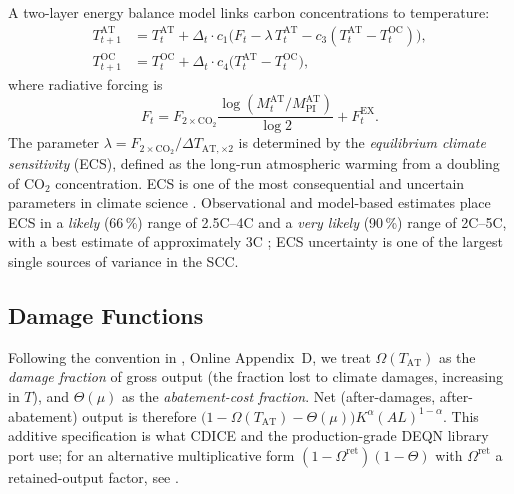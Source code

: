 \documentclass[11pt,a4paper]{report}
\begin{document}
A two-layer energy balance model links carbon concentrations to temperature:
\begin{align}
T^{\mathrm{AT}}_{t+1} &= T^{\mathrm{AT}}_t + \Delta_t \cdot c_1 \bigl(F_t - \lambda\, T^{\mathrm{AT}}_t - c_3(T^{\mathrm{AT}}_t - T^{\mathrm{OC}}_t)\bigr), \label{eq:temp_at} \\
T^{\mathrm{OC}}_{t+1} &= T^{\mathrm{OC}}_t + \Delta_t \cdot c_4 \bigl(T^{\mathrm{AT}}_t - T^{\mathrm{OC}}_t\bigr), \label{eq:temp_oc}
\end{align}
where radiative forcing is
\begin{equation}
F_t = F_{\mathrm{2\times CO_2}} \frac{\log(M^{\mathrm{AT}}_t / M^{\mathrm{AT}}_{\mathrm{PI}})}{\log 2} + F^{\mathrm{EX}}_t.
\label{eq:forcing}
\end{equation}
The parameter $\lambda = F_{\mathrm{2\times CO_2}} / \Delta T_{\mathrm{AT},\times 2}$ is determined by the \emph{equilibrium climate sensitivity} (ECS), defined as the long-run atmospheric warming from a doubling of CO$_2$ concentration.  ECS is one of the most consequential and uncertain parameters in climate science \citep{roe2007climate, knutti2017beyond}.  Observational and model-based estimates place ECS in a \emph{likely} (66\,\%) range of 2.5\textdegree C--4\textdegree C and a \emph{very likely} (90\,\%) range of 2\textdegree C--5\textdegree C, with a best estimate of approximately 3\textdegree C \citep[IPCC AR6 Synthesis Report;][]{calvinIPCC2023Climate2023a}; ECS uncertainty is one of the largest single sources of variance in the SCC.

\subsection{Damage Functions}

Following the convention in \citet{Folini_2021}, Online Appendix~D, we treat $\Omega(T_{\mathrm{AT}})$ as the \emph{damage fraction} of gross output (the fraction lost to climate damages, increasing in $T$), and $\Theta(\mu)$ as the \emph{abatement-cost fraction}.  Net (after-damages, after-abatement) output is therefore $\bigl(1 - \Omega(T_{\mathrm{AT}}) - \Theta(\mu)\bigr) K^\alpha (A L)^{1-\alpha}$.  This additive specification is what CDICE and the production-grade DEQN library port use; for an alternative multiplicative form $(1-\Omega^{\mathrm{ret}})(1-\Theta)$ with $\Omega^{\mathrm{ret}}$ a retained-output factor, see \citet{nordhaus2008question}.
\end{document}
